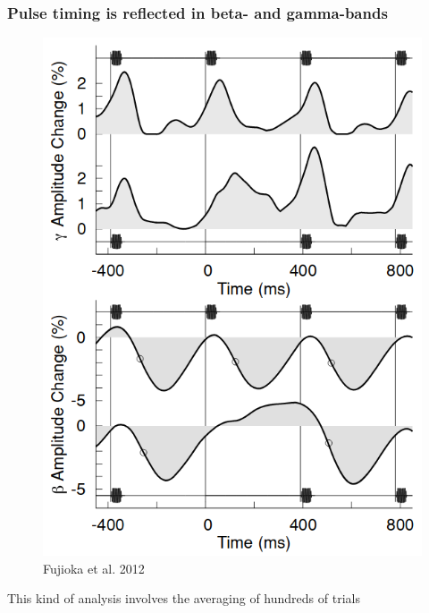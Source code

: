 \documentclass{beamer}
\begin{document}
\begin{frame}
	\frametitle{Pulse timing is reflected in beta- and gamma-bands}

	\begin{figure}
		\centering
		\includegraphics[scale=0.2]{fig2.png}
		\caption{Fujioka et al. 2012}
	\end{figure}

	This kind of analysis involves the averaging of hundreds of trials

\end{frame}
\end{document}

